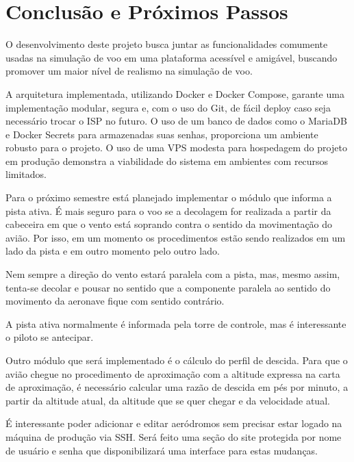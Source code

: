 \chapter{Conclusão e Próximos Passos}

O desenvolvimento deste projeto busca juntar as funcionalidades comumente usadas na 
simulação de voo em uma plataforma acessível e amigável, buscando promover um 
maior nível de realismo na simulação de voo.

A arquitetura implementada, utilizando Docker e Docker Compose, garante uma 
implementação modular, segura e, com o uso do Git, de fácil deploy caso seja 
necessário trocar o ISP no futuro. O uso de um banco de dados como
o MariaDB e Docker Secrets para armazenadas suas senhas, proporciona um 
ambiente robusto para o projeto.
O uso de uma VPS modesta para hospedagem do projeto em produção demonstra a 
viabilidade do sistema em ambientes com recursos limitados.

Para o próximo semestre está planejado implementar o 
módulo que informa a pista ativa. É mais seguro para o voo se a decolagem for 
realizada a partir da cabeceira em que o vento está soprando contra o sentido 
da movimentação do avião. Por isso, em um momento os procedimentos estão sendo 
realizados em um lado da pista e em outro momento pelo outro lado.

Nem sempre a direção do vento estará paralela com a pista, mas, mesmo assim, 
tenta-se decolar e pousar no sentido que a componente paralela ao sentido do 
movimento da aeronave fique com sentido contrário.

A pista ativa normalmente é informada pela torre de controle, mas é 
interessante o piloto se antecipar.

Outro módulo que será implementado é o cálculo do perfil de descida. Para que 
o avião chegue no procedimento de aproximação com a altitude expressa na 
carta de aproximação, é necessário calcular uma razão de descida em pés por 
minuto, a partir da altitude atual, da altitude que se quer chegar e da 
velocidade atual.

É interessante poder adicionar e editar aeródromos sem precisar estar logado
na máquina de produção via SSH. Será feito uma seção do site protegida por
nome de usuário e senha que disponibilizará uma interface para estas mudanças.